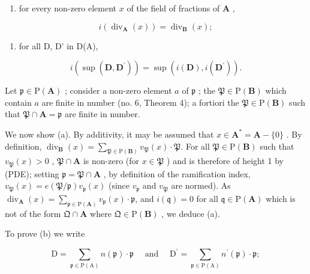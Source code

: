 \begin{enumerate}
\def\labelenumi{(\alph{enumi})}
\tightlist
\item
  for every non-zero element \(x\) of the field of fractions of \(\mathbf{A}\) ,
\end{enumerate}

\[
i \left(\operatorname{div} _ {\mathbf {A}} (x)\right) = \operatorname{div} _ {\mathbf {B}} (x);
\]

\begin{enumerate}
\def\labelenumi{(\alph{enumi})}
\setcounter{enumi}{1}
\tightlist
\item
  for all D, D' in D(A),
\end{enumerate}

\[
i \left(\sup (\mathbf {D}, \mathbf {D} ^ {\prime})\right) = \sup (i (\mathbf {D}), i (\mathbf {D} ^ {\prime})).
\]

Let \(\mathfrak{p} \in \mathrm{P}(\mathbf{A})\) ; consider a non-zero element \(a\) of \(\mathfrak{p}\) ; the \(\mathfrak{P} \in \mathrm{P}(\mathbf{B})\) which contain \(a\) are finite in number (no. 6, Theorem 4); a fortiori the \(\mathfrak{P} \in \mathrm{P}(\mathbf{B})\) such that \(\mathfrak{P} \cap \mathbf{A} = \mathfrak{p}\) are finite in number.

We now show (a). By additivity, it may be assumed that \(x \in \mathbf{A}^* = \mathbf{A} - \{0\}\) . By definition, \(\operatorname{div}_{\mathbf{B}}(x) = \sum_{\mathfrak{P} \in \mathrm{P}(\mathbf{B})} v_{\mathfrak{P}}(x) \cdot \mathfrak{P}\). For all \(\mathfrak{P} \in \mathrm{P}(\mathbf{B})\) such that \(v_{\mathfrak{P}}(x) > 0\) , \(\mathfrak{P} \cap \mathbf{A}\) is non-zero (for \(x \in \mathfrak{P}\) ) and is therefore of height 1 by (PDE); setting \(\mathfrak{p} = \mathfrak{P} \cap \mathbf{A}\) , by definition of the ramification index, \(v_{\mathfrak{P}}(x) = e(\mathfrak{P}/\mathfrak{p})v_{\mathfrak{p}}(x)\) (since \(v_{\mathfrak{p}}\) and \(v_{\mathfrak{P}}\) are normed). As \(\operatorname{div}_{\mathbf{A}}(x) = \sum_{\mathfrak{p} \in \mathrm{P}(\mathbf{A})} v_{\mathfrak{p}}(x) \cdot \mathfrak{p}\), and \(i(\mathfrak{q}) = 0\) for all \(\mathfrak{q} \in \mathrm{P}(\mathbf{A})\) which is not of the form \(\mathfrak{Q} \cap \mathbf{A}\) where \(\mathfrak{Q} \in \mathrm{P}(\mathbf{B})\) , we deduce (a).

To prove (b) we write

\[
\mathrm{D} = \sum_ {\mathfrak {p} \in \mathrm{P} (\mathrm{A})} n (\mathfrak {p}) \cdot \mathfrak {p} \quad \text { and } \quad \mathrm{D} ^ {\prime} = \sum_ {\mathfrak {p} \in \mathrm{P} (\mathrm{A})} n ^ {\prime} (\mathfrak {p}) \cdot \mathfrak {p};
\]

